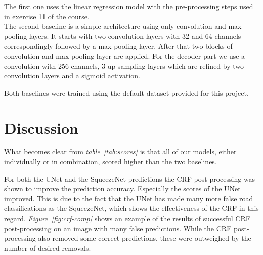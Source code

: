 \documentclass[10pt,conference,compsocconf]{IEEEtran}
\begin{document}
The first one uses the linear regression model with the pre-processing steps used in exercise 11 of the course. \\
The second baseline is a simple architecture using only convolution and max-pooling layers. It starts with two convolution layers with 32 and 64 channels correspondingly followed by a max-pooling layer. After that two blocks of convolution and max-pooling layer are applied. For the decoder part we use a convolution with 256 channels, 3 up-sampling layers which are refined by two convolution layers and a sigmoid activation.

Both baselines were trained using the default dataset provided for this project.

\section{Discussion}
What becomes clear from \textit{table~\ref{tab:scores}} is that all of our models, either individually or in combination, scored higher than the two baselines.

For both the UNet and the SqueezeNet predictions the CRF post-processing was shown to improve the prediction accuracy. Especially the scores of the UNet improved. This is due to the fact that the UNet has made many more false road classifications as the SqueezeNet, which shows the effectiveness of the CRF in this regard.  \textit{Figure~\ref{fig:crf-comp}} shows an example of the results of successful CRF post-processing on an image with many false predictions.  While the CRF post-processing also removed some correct predictions, these were outweighed by the number of desired removals.
\end{document}
